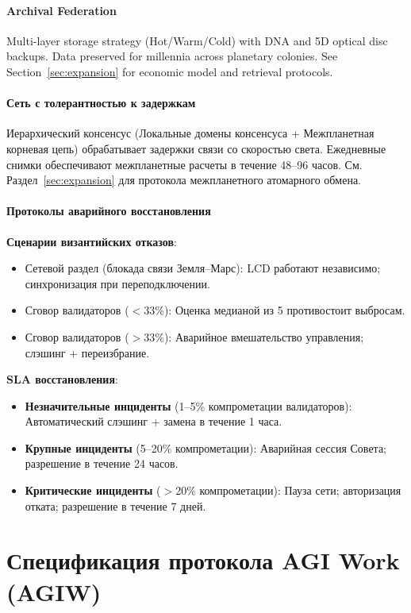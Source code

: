 \documentclass[11pt]{article}
\begin{document}
\paragraph{Archival Federation}
Multi-layer storage strategy (Hot/Warm/Cold) with DNA and 5D optical disc backups. Data preserved for millennia across planetary colonies. See Section~\ref{sec:expansion} for economic model and retrieval protocols.

\paragraph{Сеть с толерантностью к задержкам}
Иерархический консенсус (Локальные домены консенсуса + Межпланетная корневая цепь) обрабатывает задержки связи со скоростью света. Ежедневные снимки обеспечивают межпланетные расчеты в течение 48--96 часов. См. Раздел~\ref{sec:expansion} для протокола межпланетного атомарного обмена.

\paragraph{Протоколы аварийного восстановления}
\textbf{Сценарии византийских отказов}:
\begin{itemize}[noitemsep]
  \item Сетевой раздел (блокада связи Земля--Марс): LCD работают независимо; синхронизация при переподключении.
  \item Сговор валидаторов ($<$33\%): Оценка медианой из 5 противостоит выбросам.
  \item Сговор валидаторов ($>$33\%): Аварийное вмешательство управления; слэшинг + переизбрание.
\end{itemize}

\textbf{SLA восстановления}:
\begin{itemize}[noitemsep]
  \item \textbf{Незначительные инциденты} (1--5\% компрометации валидаторов): Автоматический слэшинг + замена в течение 1 часа.
  \item \textbf{Крупные инциденты} (5--20\% компрометации): Аварийная сессия Совета; разрешение в течение 24 часов.
  \item \textbf{Критические инциденты} ($>$20\% компрометации): Пауза сети; авторизация отката; разрешение в течение 7 дней.
\end{itemize}

\section{Спецификация протокола AGI Work (AGIW)}
\label{sec:agiw-spec}
\end{document}
